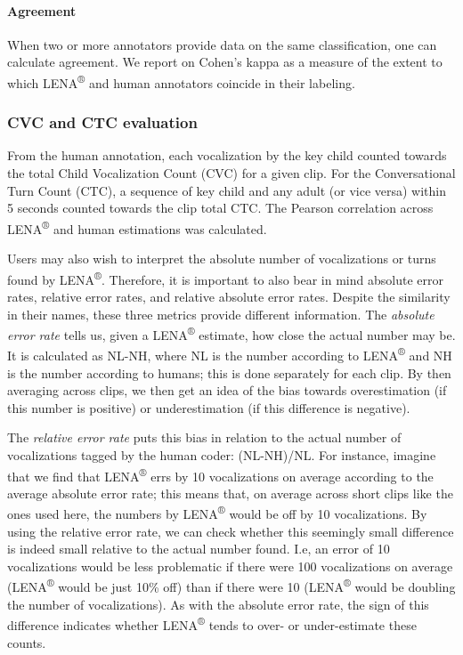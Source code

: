 \documentclass[english,table,man,floatsintext]{apa6}
\let\oldparagraph\paragraph
\renewcommand{\paragraph}[1]{\oldparagraph{#1}\mbox{}}
\begin{document}
\paragraph{Agreement}\label{agreement}

When two or more annotators provide data on the same classification, one
can calculate agreement. We report on Cohen's kappa as a measure of the
extent to which LENA\textsuperscript{®} and human annotators coincide in
their labeling.

\subsubsection{CVC and CTC evaluation}\label{cvc-and-ctc-evaluation}

From the human annotation, each vocalization by the key child counted
towards the total Child Vocalization Count (CVC) for a given clip. For
the Conversational Turn Count (CTC), a sequence of key child and any
adult (or vice versa) within 5 seconds counted towards the clip total
CTC. The Pearson correlation across LENA\textsuperscript{®} and human
estimations was calculated.

Users may also wish to interpret the absolute number of vocalizations or
turns found by LENA\textsuperscript{®}. Therefore, it is important to
also bear in mind absolute error rates, relative error rates, and
relative absolute error rates. Despite the similarity in their names,
these three metrics provide different information. The \emph{absolute
error rate} tells us, given a LENA\textsuperscript{®} estimate, how
close the actual number may be. It is calculated as NL-NH, where NL is
the number according to LENA\textsuperscript{®} and NH is the number
according to humans; this is done separately for each clip. By then
averaging across clips, we then get an idea of the bias towards
overestimation (if this number is positive) or underestimation (if this
difference is negative).

The \emph{relative error rate} puts this bias in relation to the actual
number of vocalizations tagged by the human coder: (NL-NH)/NL. For
instance, imagine that we find that LENA\textsuperscript{®} errs by 10
vocalizations on average according to the average absolute error rate;
this means that, on average across short clips like the ones used here,
the numbers by LENA\textsuperscript{®} would be off by 10 vocalizations.
By using the relative error rate, we can check whether this seemingly
small difference is indeed small relative to the actual number found.
I.e, an error of 10 vocalizations would be less problematic if there
were 100 vocalizations on average (LENA\textsuperscript{®} would be just
10\% off) than if there were 10 (LENA\textsuperscript{®} would be
doubling the number of vocalizations). As with the absolute error rate,
the sign of this difference indicates whether LENA\textsuperscript{®}
tends to over- or under-estimate these counts.
\end{document}

